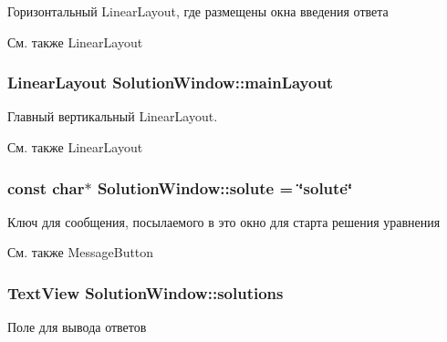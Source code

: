 Горизонтальный LinearLayout, где размещены окна введения ответа 

\begin{DoxySeeAlso}{См. также}
LinearLayout  
\end{DoxySeeAlso}
\hypertarget{group___u_i_ga22e650d520c660766cd052b6ba1fb74e}{
\subsubsection[{mainLayout}]{\setlength{\rightskip}{0pt plus 5cm}LinearLayout {\bf SolutionWindow::mainLayout}}}
\label{group___u_i_ga22e650d520c660766cd052b6ba1fb74e}


Главный вертикальный LinearLayout. 

\begin{DoxySeeAlso}{См. также}
LinearLayout  
\end{DoxySeeAlso}
\hypertarget{group___u_i_ga4e207ce02c4161839da7448825e51b42}{
\subsubsection[{solute}]{\setlength{\rightskip}{0pt plus 5cm}const char$\ast$ {\bf SolutionWindow::solute} = \char`\"{}solute\char`\"{}}}
\label{group___u_i_ga4e207ce02c4161839da7448825e51b42}


Ключ для сообщения, посылаемого в это окно для старта решения уравнения 

\begin{DoxySeeAlso}{См. также}
MessageButton  
\end{DoxySeeAlso}
\hypertarget{group___u_i_ga7acf2d96092ec6254f5dde5ca9fa5b27}{
\subsubsection[{solutions}]{\setlength{\rightskip}{0pt plus 5cm}TextView {\bf SolutionWindow::solutions}}}
\label{group___u_i_ga7acf2d96092ec6254f5dde5ca9fa5b27}


Поле для вывода ответов 

